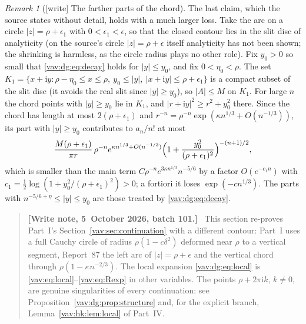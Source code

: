 \documentclass[11pt]{article}
\theoremstyle{remark}\newtheorem{remark}[theorem]{Remark}
\newcommand{\ii}{\mathrm i}
\newenvironment{writenoteb}{\begin{quote}\small\raggedright\textbf{[Write note, 5~October 2026, batch 101.]}\ }{\end{quote}}
\begin{document}
\begin{remark}[{[write]} The farther parts of the chord]\label{vav:dg:rem:farchord}
The last claim, which the source states without detail, holds with a much
larger loss. Take the arc on a circle $|z|=\rho+\epsilon_1$ with
$0<\epsilon_1<\epsilon$, so that the closed contour lies in the slit disc
of analyticity (on the source's circle $|z|=\rho+\epsilon$ itself analyticity
has not been shown; the shrinking is harmless, as the circle radius plays no
other role). Fix $y_0>0$ so small that \eqref{vav:dg:eq:decay} holds for
$|y|\le y_0$, and fix $0<\eta_0<\rho$. The set
$K_1=\{x+\ii y:\rho-\eta_0\le x\le\rho,\ y_0\le|y|,\ |x+\ii y|\le\rho+\epsilon_1\}$
is a compact subset of the slit disc (it avoids the real slit since
$|y|\ge y_0$), so $|A|\le M$ on $K_1$. For large $n$ the chord points with
$|y|\ge y_0$ lie in $K_1$, and $|r+\ii y|^2\ge r^2+y_0^2$ there. Since the
chord has length at most $2(\rho+\epsilon_1)$ and
$r^{-n}=\rho^{-n}\exp(\kappa n^{1/3}+O(n^{-1/3}))$, its part with
$|y|\ge y_0$ contributes to $a_n/n!$ at most
\[
 \frac{M(\rho+\epsilon_1)}{\pi r}\,
 \rho^{-n}e^{\kappa n^{1/3}+O(n^{-1/3})}
 \Bigl(1+\frac{y_0^2}{(\rho+\epsilon_1)^2}\Bigr)^{-(n+1)/2},
\]
which is smaller than the main term $C\rho^{-n}e^{3\kappa n^{1/3}}n^{-5/6}$
by a factor $O(e^{-c_1n})$ with
$c_1=\tfrac12\log(1+y_0^2/(\rho+\epsilon_1)^2)>0$; a fortiori it loses
$\exp(-cn^{1/3})$. The parts with $n^{-5/6+\eta}\le|y|\le y_0$ are those
treated by \eqref{vav:dg:eq:decay}.
\end{remark}
\begin{writenoteb}
This section re-proves Part~I's Section~\ref{vav:sec:continuation} with
a different contour: Part~I uses a full Cauchy circle of radius
$\rho(1-c\delta^2)$ deformed near $\rho$ to a vertical segment, Report~87
the left arc of $|z|=\rho+\epsilon$ and the vertical chord through
$\rho(1-\kappa n^{-2/3})$. The local expansion \eqref{vav:dg:eq:local} is
\eqref{vav:eq:local}--\eqref{vav:eq:Rexp} in other variables. The points
$\rho+2\pi\ii k$, $k\ne0$, are genuine singularities of every continuation:
see Proposition~\ref{vav:dg:prop:structure} and, for the explicit branch,
Lemma~\ref{vav:hk:lem:local} of Part~IV.
\end{writenoteb}
\end{document}
